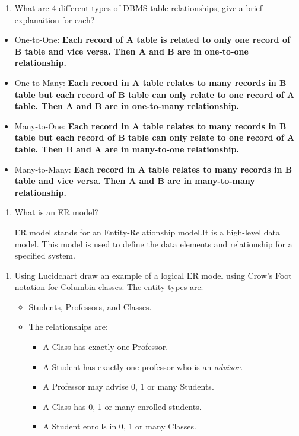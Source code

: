 \documentclass[11pt]{article}
\providecommand{\tightlist}{%
      \setlength{\itemsep}{0pt}\setlength{\parskip}{0pt}}
\begin{document}
    \begin{enumerate}
\def\labelenumi{\arabic{enumi}.}
\setcounter{enumi}{3}
\tightlist
\item
  What are 4 different types of DBMS table relationships, give a brief
  explanaition for each?
\end{enumerate}

\begin{itemize}
\tightlist
\item
  One-to-One: \textbf{Each record of A table is related to only one
  record of B table and vice versa. Then A and B are in one-to-one
  relationship.}
\item
  One-to-Many: \textbf{Each record in A table relates to many records in
  B table but each record of B table can only relate to one record of A
  table. Then A and B are in one-to-many relationship.}
\item
  Many-to-One: \textbf{Each record in A table relates to many records in
  B table but each record of B table can only relate to one record of A
  table. Then B and A are in many-to-one relationship.}
\item
  Many-to-Many: \textbf{Each record in A table relates to many records
  in B table and vice versa. Then A and B are in many-to-many
  relationship.}
\end{itemize}

    \begin{enumerate}
\def\labelenumi{\arabic{enumi}.}
\setcounter{enumi}{4}
\item
  What is an ER model?

  ER model stands for an Entity-Relationship model.It is a high-level
  data model. This model is used to define the data elements and
  relationship for a specified system.
\end{enumerate}

    \begin{enumerate}
\def\labelenumi{\arabic{enumi}.}
\setcounter{enumi}{5}
\tightlist
\item
  Using Lucidchart draw an example of a logical ER model using Crow's
  Foot notation for Columbia classes. The entity types are:

  \begin{itemize}
  \tightlist
  \item
    Students, Professors, and Classes.
  \item
    The relationships are:

    \begin{itemize}
    \tightlist
    \item
      A Class has exactly one Professor.
    \item
      A Student has exactly one professor who is an \emph{advisor.}
    \item
      A Professor may advise 0, 1 or many Students.
    \item
      A Class has 0, 1 or many enrolled students.
    \item
      A Student enrolls in 0, 1 or many Classes.
    \end{itemize}
  \end{itemize}
\end{enumerate}
\end{document}
